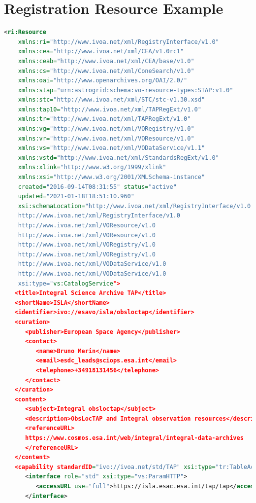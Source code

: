 \documentclass[11pt,a4paper]{ivoa}
\begin{document}
\section{Registration Resource Example}
\begin{lstlisting}[language=XML]
<ri:Resource 
	xmlns:ri="http://www.ivoa.net/xml/RegistryInterface/v1.0" 
	xmlns:cea="http://www.ivoa.net/xml/CEA/v1.0rc1" 
	xmlns:ceab="http://www.ivoa.net/xml/CEA/base/v1.0" 
	xmlns:cs="http://www.ivoa.net/xml/ConeSearch/v1.0" 
	xmlns:oai="http://www.openarchives.org/OAI/2.0/" 
	xmlns:stap="urn:astrogrid:schema:vo-resource-types:STAP:v1.0" 
	xmlns:stc="http://www.ivoa.net/xml/STC/stc-v1.30.xsd" 
	xmlns:tap10="http://www.ivoa.net/xml/TAPRegExt/v1.0" 
	xmlns:tr="http://www.ivoa.net/xml/TAPRegExt/v1.0" 
	xmlns:vg="http://www.ivoa.net/xml/VORegistry/v1.0" 
	xmlns:vr="http://www.ivoa.net/xml/VOResource/v1.0" 
	xmlns:vs="http://www.ivoa.net/xml/VODataService/v1.1" 
	xmlns:vstd="http://www.ivoa.net/xml/StandardsRegExt/v1.0" 
	xmlns:xlink="http://www.w3.org/1999/xlink" 
	xmlns:xsi="http://www.w3.org/2001/XMLSchema-instance" 
	created="2016-09-14T08:31:55" status="active" 
	updated="2021-01-18T18:51:10.960" 
	xsi:schemaLocation="http://www.ivoa.net/xml/RegistryInterface/v1.0   
	http://www.ivoa.net/xml/RegistryInterface/v1.0                    
	http://www.ivoa.net/xml/VOResource/v1.0          
	http://www.ivoa.net/xml/VOResource/v1.0                     
	http://www.ivoa.net/xml/VORegistry/v1.0          
	http://www.ivoa.net/xml/VORegistry/v1.0                     
	http://www.ivoa.net/xml/VODataService/v1.0       
	http://www.ivoa.net/xml/VODataService/v1.0
	xsi:type="vs:CatalogService">
   <title>Integral Science Archive TAP</title>
   <shortName>ISLA</shortName>
   <identifier>ivo://esavo/isla/obsloctap</identifier>
   <curation>
      <publisher>European Space Agency</publisher>
      <contact>
         <name>Bruno Merin</name>
         <email>esdc_leads@sciops.esa.int</email>
         <telephone>+34918131456</telephone>
      </contact>
   </curation>
   <content>
      <subject>Integral obsloctap</subject>
      <description>ObsLocTAP and Integral observation resources</description>
      <referenceURL>
      https://www.cosmos.esa.int/web/integral/integral-data-archives
      </referenceURL>
   </content>
   <capability standardID="ivo://ivoa.net/std/TAP" xsi:type="tr:TableAccess">
      <interface role="std" xsi:type="vs:ParamHTTP">
         <accessURL use="full">https://isla.esac.esa.int/tap/tap</accessURL>
      </interface>

\end{lstlisting}
\end{document}
